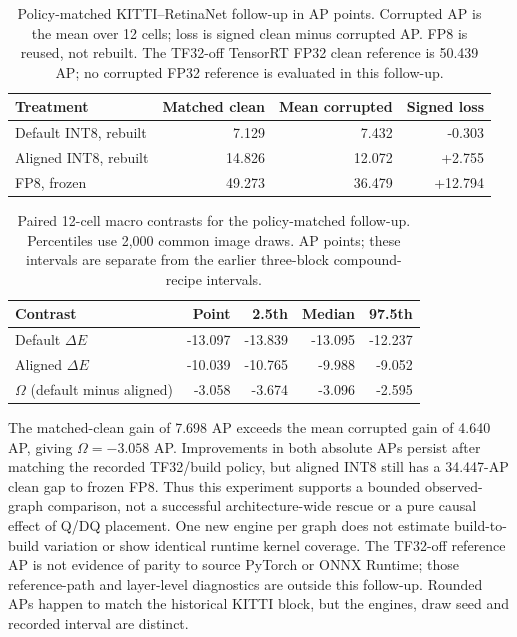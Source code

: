 \documentclass[10pt]{article}
\newcommand{\DeltaE}{\Delta E}
\begin{document}
\begin{table}[htbp]
\centering\small
\caption{Policy-matched KITTI--RetinaNet follow-up in AP points. Corrupted
AP is the mean over 12 cells; loss is signed clean minus corrupted AP.
FP8 is reused, not rebuilt. The TF32-off TensorRT FP32 clean reference is
50.439 AP; no corrupted FP32 reference is evaluated in this follow-up.}
\label{tab:controlled-absolute}
\begin{tabular}{lrrr}
\toprule
Treatment & Matched clean & Mean corrupted & Signed loss \\
\midrule
Default INT8, rebuilt & 7.129 & 7.432 & -0.303 \\
Aligned INT8, rebuilt & 14.826 & 12.072 & +2.755 \\
FP8, frozen & 49.273 & 36.479 & +12.794 \\
\bottomrule
\end{tabular}
\end{table}

\begin{table}[htbp]
\centering\small
\caption{Paired 12-cell macro contrasts for the policy-matched follow-up.
Percentiles use 2,000 common image draws. AP points; these intervals are
separate from the earlier three-block compound-recipe intervals.}
\label{tab:controlled-contrast}
\begin{tabular}{lrrrr}
\toprule
Contrast & Point & 2.5th & Median & 97.5th \\
\midrule
Default $\DeltaE$ & -13.097 & -13.839 & -13.095 & -12.237 \\
Aligned $\DeltaE$ & -10.039 & -10.765 & -9.988 & -9.052 \\
$\Omega$ (default minus aligned) & -3.058 & -3.674 & -3.096 & -2.595 \\
\bottomrule
\end{tabular}
\end{table}

The matched-clean gain of 7.698 AP exceeds the mean corrupted gain of
4.640 AP, giving $\Omega=-3.058$ AP. Improvements in both absolute APs
persist after matching the recorded TF32/build policy, but aligned INT8
still has a 34.447-AP clean gap to frozen FP8. Thus this experiment supports
a bounded observed-graph comparison, not a successful architecture-wide
rescue or a pure causal effect of Q/DQ placement. One new engine per graph
does not estimate build-to-build variation or show identical runtime kernel
coverage. The TF32-off reference AP is not evidence of parity to source
PyTorch or ONNX Runtime; those reference-path and layer-level diagnostics
are outside this follow-up. Rounded APs happen to match the historical
KITTI block, but the engines, draw seed and recorded interval are distinct.
\end{document}
